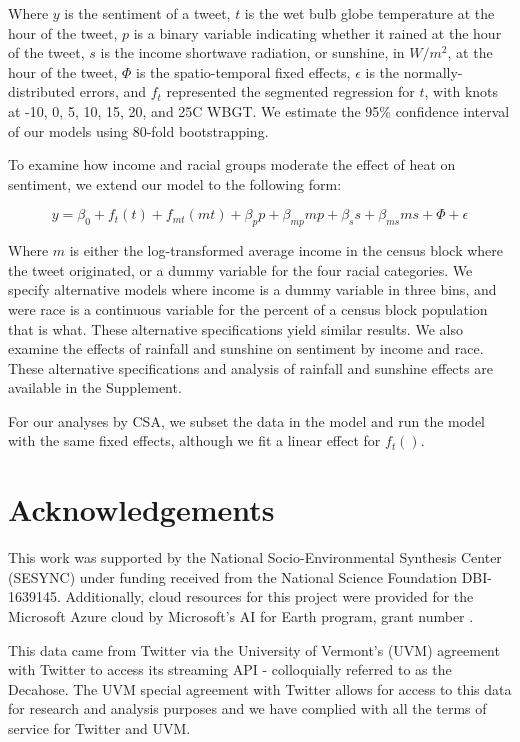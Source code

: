 \documentclass[fleqn,10pt]{wlscirep}
\begin{document}
Where $y$ is the sentiment of a tweet, $t$ is the wet bulb globe temperature at the hour of the tweet, $p$ is a binary variable indicating whether it rained at the hour of the tweet, $s$ is the income shortwave radiation, or sunshine, in $W/m^2$, at the hour of the tweet, $\Phi$ is the spatio-temporal fixed effects, $\epsilon$ is the normally-distributed errors, and $f_t$ represented the segmented regression for $t$, with knots at -10\textdegree, 0\textdegree, 5\textdegree, 10\textdegree, 15\textdegree, 20\textdegree, and 25\textdegree C WBGT.  We estimate the 95\% confidence interval of our models using 80-fold bootstrapping.  

To examine how income and racial groups moderate the effect of heat on sentiment, we extend our model to the following form:

\begin{equation}
    y = \beta_0 + f_t(t) + f_{mt}(m t) + \beta_p p + \beta_{mp} m p + \beta_s s + \beta_{ms} m s + \Phi + \epsilon
\end{equation}

Where $m$ is either the log-transformed average income in the census block where the tweet originated, or a dummy variable for the four racial categories.  We specify alternative models where income is a dummy variable in three bins, and were race is a continuous variable for the percent of a census block population that is what.  These alternative specifications yield similar results.  We also examine the effects of rainfall and sunshine on sentiment by income and race.  These alternative specifications and analysis of rainfall and sunshine effects are available in the Supplement.

For our analyses by CSA, we subset the data in the model and run the model with the same fixed effects, although we fit a linear effect for $f_t()$.


\section*{Acknowledgements}
This work was supported by the National Socio-Environmental Synthesis Center (SESYNC) under funding received from the National Science Foundation DBI-1639145.  Additionally, cloud resources for this project were provided for the Microsoft Azure cloud by Microsoft's AI for Earth program, grant number .

This data came from Twitter via the University of Vermont’s (UVM) agreement with Twitter to access its streaming API - colloquially referred to as the Decahose.  The UVM special agreement with Twitter allows for access to this data for research and analysis purposes and we have complied with all the terms of service for Twitter and UVM. 
\end{document}
